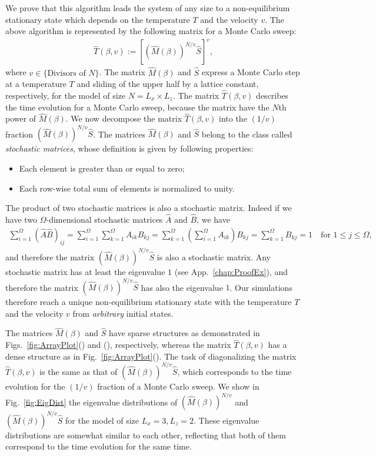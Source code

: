 We prove that this algorithm leads the system of any size to a non-equilibrium stationary state which depends on the temperature $T$ and the velocity $v$. The above algorithm is represented by the following matrix for a Monte Carlo sweep:
\begin{align}
\hat{T}(\beta,v):=\left[\left(\hat{M}(\beta)\right)^{N/v}\hat{S}\right]^{v},
\end{align}
where $v\in\{\text{Divisors of }N\}$. The matrix $\hat{M}(\beta)$ and $\hat{S}$ express a Monte Carlo step at a temperature $T$ and sliding of the upper half by a lattice constant, respectively, for the model of size $N=L_{x}\times L_{z}$. The matrix $\hat{T}(\beta,v)$ describes the time evolution for a Monte Carlo sweep, because the matrix have the $N$th power of $\hat{M}(\beta)$. We now decompose the matrix $\hat{T}(\beta,v)$ into the $(1/v)$ fraction $\left(\hat{M}(\beta)\right)^{N/v}\hat{S}$.
The matrices $\hat{M}(\beta)$ and $\hat{S}$ belong to the class called \textit{stochastic matrices}, whose definition is given by following properties:
\begin{itemize}
	\item Each element is greater than or equal to zero;
	\item Each row-wise total sum of elements is normalized to unity.
\end{itemize}
The product of two stochastic matrices is also a stochastic matrix. Indeed if we have two $\Omega$-dimensional stochastic matrices $\hat{A}$ and $\hat{B}$, we have
\begin{align}
\sum_{i=1}^{\Omega}(\hat{A}\hat{B})_{ij} = \sum_{i=1}^{\Omega}\sum_{k=1}^{\Omega}A_{ik}B_{kj} = \sum_{k=1}^{\Omega}\left(\sum_{i=1}^{\Omega}A_{ik}\right)B_{kj} = \sum_{k=1}^{\Omega}B_{kj} = 1 \quad\text{for $1\leq j\leq \Omega$},
\end{align}
and therefore the matrix $\left(\hat{M}(\beta)\right)^{N/v}\hat{S}$ is also a stochastic matrix. Any stochastic matrix has at least the eigenvalue $1$ (see App.~\ref{chap:ProofEx}), and therefore the matrix $\left(\hat{M}(\beta)\right)^{N/v}\hat{S}$ has also the eigenvalue $1$. Our simulations therefore reach a unique non-equilibrium stationary state with the temperature $T$ and the velocity $v$ from \textit{arbitrary} initial states.

The matrices $\hat{M}(\beta)$ and $\hat{S}$ have sparse structures as demonstrated in Figs.~\ref{fig:ArrayPlot}() and (), respectively, whereas the matrix $\hat{T}(\beta,v)$ has a dense structure as in Fig.~\ref{fig:ArrayPlot}(). The task of diagonalizing the matrix $\hat{T}(\beta,v)$ is the same as that of $\left(\hat{M}(\beta)\right)^{N/v}\hat{S}$, which corresponds to the time evolution for the $(1/v)$ fraction of a Monte Carlo sweep. We show in Fig.~\ref{fig:EigDist} the eigenvalue distributions of $\left(\hat{M}(\beta)\right)^{N/v}$ and $\left(\hat{M}(\beta)\right)^{N/v}\hat{S}$ for the model of size $L_{x}=3,L_{z}=2$. These eigenvalue distributions are somewhat similar to each other, reflecting that both of them correspond to 
the time evolution for the same time.

